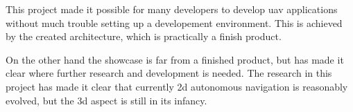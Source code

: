 This project made it possible for many developers to develop \acs{uav} applications without much trouble setting up a developement environment. This is achieved by the created architecture, which is practically a finish product.

On the other hand the showcase is far from a finished product, but has made it clear where further research and development is needed. The research in this project has made it clear that currently \acs{2d} autonomous navigation is reasonably evolved, but the \acs{3d} aspect is still in its infancy.